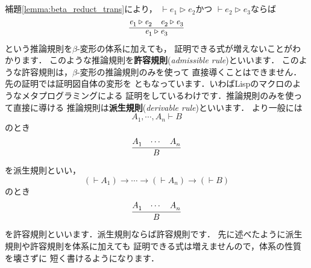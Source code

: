 \documentclass{ltjsbook}%
\newcommand\lemmaname{補題}%
\newcommand\term[2]{\textbf{#1}{(\textit{#2})}}%
\begin{document}
\lemmaname\ref{lemma:beta_reduct_trans}により，%
$\vdash\mathit{e}_1^{}\triangleright\mathit{e}_2^{}$かつ%
$\vdash\mathit{e}_2^{}\triangleright\mathit{e}_3^{}$ならば%
\begin{equation}%
  \infer{%
    \mathit{e}_1^{}\triangleright\mathit{e}_3^{}%
  }{%
    \mathit{e}_1^{}\triangleright\mathit{e}_2^{}%
  &%
    \mathit{e}_2^{}\triangleright\mathit{e}_3^{}%
  }%
\end{equation}%
という推論規則を$\beta$-変形の体系に加えても，%
証明できる式が増えないことがわかります．%
このような推論規則を\term{許容規則}{admissible rule}といいます．%
このような許容規則は，$\beta$-変形の推論規則のみを使って%
直接導くことはできません．先の証明では証明図自体の変形を%
ともなっています．いわばLispのマクロのようなメタプログラミングによる%
証明をしているわけです．推論規則のみを使って直接に導ける%
推論規則は\term{派生規則}{derivable rule}といいます．%
より一般には%
\begin{equation}%
  A_1^{},\cdots,A_n^{}\vdash B%
\end{equation}%
のとき%
\begin{equation}%
  \infer{%
    B%
  }{%
    A_1^{}&\cdots&A_n^{}%
  }%
\end{equation}%
を派生規則といい，%
\begin{equation}%
  (\vdash A_1^{})\rightarrow\cdots\rightarrow(\vdash A_n^{})\rightarrow(\vdash B)%
\end{equation}%
のとき%
\begin{equation}%
  \infer{%
    B%
  }{%
    A_1^{}&\cdots&A_n^{}%
  }%
\end{equation}%
を許容規則といいます．派生規則ならば許容規則です．%
先に述べたように派生規則や許容規則を体系に加えても%
証明できる式は増えませんので，体系の性質を壊さずに%
短く書けるようになります．%
\end{document}
